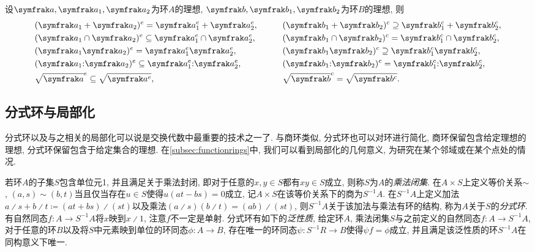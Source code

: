 \begin{proposition}\label{prop:extencontrop}
  设$\ideal{a}, \ideal{a}_1, \ideal{a}_2$为环$A$的理想, $\ideal{b}, \ideal{b}_1, \ideal{b}_2$为环$B$的理想, 则
  \begin{equation*}
    \begin{aligned}
      &(\ideal{a}_1+\ideal{a}_2)^e=\ideal{a}_1^e+\ideal{a}_2^e,
      &&\qquad(\ideal{b}_1+\ideal{b_2})^c\supseteq \ideal{b}_1^c+\ideal{b}_2^c,\\
      &(\ideal{a}_1\cap\ideal{a}_2)^e\subseteq\ideal{a}_1^e\cap\ideal{a}_2^e,
      &&\qquad(\ideal{b}_1\cap\ideal{b_2})^c= \ideal{b}_1^c\cap\ideal{b}_2^c,\\
      &(\ideal{a}_1\ideal{a}_2)^e=\ideal{a}_1^e\ideal{a}_2^e,
      &&\qquad(\ideal{b}_1\ideal{b_2})^c\supseteq\ideal{b}_1^c\ideal{b}_2^c,\\
      &(\ideal{a}_1{:}\ideal{a}_2)^e\subseteq\ideal{a}_1^e{:}\ideal{a}_2^e,
      &&\qquad(\ideal{b}_1{:}\ideal{b_2})^c= \ideal{b}_1^c{:}\ideal{b}_2^c,\\
      &\sqrt{\ideal{a}}^e\subseteq\sqrt{\ideal{a}^e},
      &&\qquad\sqrt{\ideal{b}}^c= \sqrt{\ideal{b}^c}.
    \end{aligned}
  \end{equation*}
\end{proposition}

\subsection{分式环与局部化}\label{subsec:algebra-localization}

分式环以及与之相关的局部化可以说是交换代数中最重要的技术之一了. 与商环类似, 分式环也可以对环进行简化, 商环保留包含给定理想的理想, 分式环保留包含于给定集合的理想. 在\ref{subsec:functionrings}中, 我们可以看到局部化的几何意义, 为研究在某个邻域或在某个点处的情况.

若环$A$的子集$S$包含单位元1, 并且满足关于乘法封闭, 即对于任意的$x, y\in S$都有$xy\in S$成立, 则称$S$为$A$的\emph{乘法闭集}. 在$A\times S$上定义等价关系${\sim}$, $(a, s)\sim (b, t)$当且仅当存在$u\in S$使得$u(at-bs)=0$成立, 记$A\times S$在该等价关系下的商为$S^{-1}A$. 在$S^{-1}A$上定义加法$a{\divslash} s+b{\divslash}t \coloneq  (at+bs){\divslash}(st)$以及乘法$(a{\divslash}s)(b{\divslash}t)=(ab){\divslash}(st)$, 则$S^{-1}A$关于该加法与乘法有环的结构, 称为$A$关于$S$的\emph{分式环}. 有自然同态$f\colon A\to S^{-1}A$将$x$映到$x{\divslash}1$, 注意$f$不一定是单射. 分式环有如下的\emph{泛性质}\parencites[81, Theorem 11.3]{altman_term_2017}[37, Proposition 3.1]{atiyah_introduction_1969}, 给定环$A$, 乘法闭集$S$与之前定义的自然同态$f\colon A\to S^{-1}A$, 对于任意的环$B$以及将$S$中元素映到单位的环同态$\phi\colon A\to B$, 存在唯一的环同态$\psi\colon S^{-1}R\to B$使得$\psi f=\phi$成立, 并且满足该泛性质的环$S^{-1}A$在同构意义下唯一.

